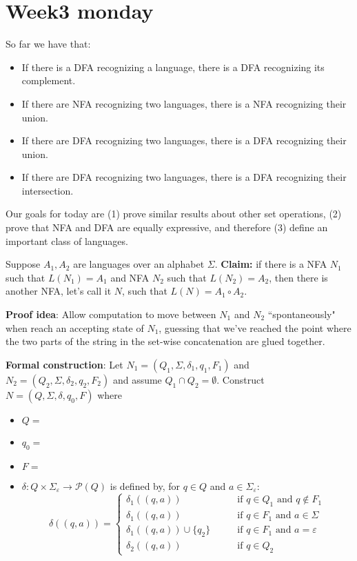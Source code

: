 \documentclass[12pt, oneside]{article}
\begin{document}
\begin{flushright}
\end{flushright} \section*{Week3 monday}


So far we have that: 
\begin{itemize}
\item If there is a DFA recognizing a language, there is a DFA recognizing its complement.
\item If there are NFA recognizing two languages, there is a NFA recognizing their union.
\item If there are DFA recognizing two languages, there is a DFA recognizing their union.
\item If there are DFA recognizing two languages, there is a DFA recognizing their intersection.
\end{itemize}

Our goals for today are (1) prove similar results about other set operations, (2) prove that 
NFA and DFA are equally expressive, and therefore (3) define an important class of languages.

\vfill

\newpage
Suppose $A_1, A_2$ are languages over an alphabet $\Sigma$.
{\bf Claim:} if there is a NFA $N_1$ such that $L(N_1) = A_1$ and 
NFA $N_2$ such that $L(N_2) = A_2$, then there is another NFA, let's call it $N$, such that 
$L(N) = A_1 \circ A_2$.

{\bf Proof idea}: Allow computation to move between $N_1$ and $N_2$ ``spontaneously" when reach an accepting state of 
$N_1$, guessing that we've reached the point where the two parts of the string in the set-wise concatenation 
are glued together.


{\bf Formal construction}: Let 
$N_1 = (Q_1, \Sigma, \delta_1, q_1, F_1)$ and $N_2 = (Q_2, \Sigma, \delta_2,q_2, F_2)$
and assume $Q_1 \cap Q_2 = \emptyset$.
Construct $N = (Q, \Sigma, \delta, q_0, F)$ where
\begin{itemize}
    \item $Q = $
    \item $q_0 = $
    \item $F = $
    \item $\delta: Q \times \Sigma_\varepsilon \to \mathcal{P}(Q)$ is defined by, for $q \in Q$ and $a \in \Sigma_{\varepsilon}$:
        \[
            \delta((q,a))=\begin{cases}  
                \delta_1 ((q,a)) &\qquad\text{if } q\in Q_1 \textrm{ and } q \notin F_1\\ 
                \delta_1 ((q,a)) &\qquad\text{if } q\in F_1 \textrm{ and } a \in \Sigma\\ 
                \delta_1 ((q,a)) \cup \{q_2\} &\qquad\text{if } q\in F_1 \textrm{ and } a = \varepsilon\\ 
                \delta_2 ((q,a)) &\qquad\text{if } q\in Q_2
            \end{cases}
        \]
\end{itemize}
\end{document}
